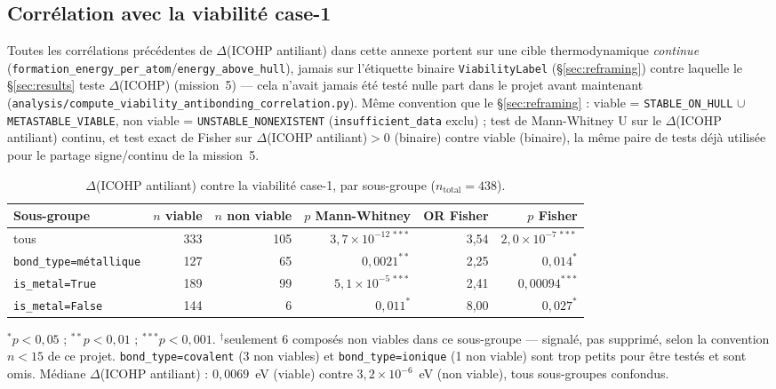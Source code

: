\documentclass[11pt,a4paper]{article}
\begin{document}
\subsection{Corrélation avec la viabilité case-1}
\label{sec:antibonding-viability}

Toutes les corrélations précédentes de $\Delta$(ICOHP antiliant) dans
cette annexe portent sur une cible thermodynamique \emph{continue}
(\texttt{formation\_energy\_per\_atom}/\texttt{energy\_above\_hull}),
jamais sur l'étiquette binaire \texttt{ViabilityLabel}
(\S\ref{sec:reframing}) contre laquelle le \S\ref{sec:results} teste
$\Delta$(ICOHP) (mission~5) --- cela n'avait jamais été testé nulle part
dans le projet avant maintenant
(\texttt{analysis/compute\_viability\_antibonding\_correlation.py}).
Même convention que le \S\ref{sec:reframing} : viable =
\texttt{STABLE\_ON\_HULL} $\cup$ \texttt{METASTABLE\_VIABLE}, non viable
= \texttt{UNSTABLE\_NONEXISTENT} (\texttt{insufficient\_data} exclu) ;
test de Mann-Whitney U sur le $\Delta$(ICOHP antiliant) continu, et test
exact de Fisher sur $\Delta$(ICOHP antiliant)$>0$ (binaire) contre viable
(binaire), la même paire de tests déjà utilisée pour le partage
signe/continu de la mission~5.

\begin{table}[htbp]
\centering
\caption{$\Delta$(ICOHP antiliant) contre la viabilité case-1, par sous-groupe ($n_\text{total}=438$).}
\label{tab:viability-antibonding}
\begin{tabular}{@{}lrrrrr@{}}
\toprule
Sous-groupe & $n$ viable & $n$ non viable & $p$ Mann-Whitney & OR Fisher & $p$ Fisher \\
\midrule
tous                     & 333 & 105 & $3,7\times10^{-12\,***}$ & 3,54 & $2,0\times10^{-7\,***}$ \\
\texttt{bond\_type=métallique} & 127 & 65  & $0{,}0021^{**}$          & 2,25 & $0{,}014^{*}$ \\
\texttt{is\_metal=True}      & 189 & 99  & $5,1\times10^{-5\,***}$  & 2,41 & $0{,}00094^{***}$ \\
\texttt{is\_metal=False}     & 144 & 6\rlap{$^\dagger$}   & $0{,}011^{*}$            & 8,00 & $0{,}027^{*}$ \\
\bottomrule
\end{tabular}

\vspace{0.15cm}
{\footnotesize $^{*}p<0{,}05$ ; $^{**}p<0{,}01$ ; $^{***}p<0{,}001$.
$^\dagger$seulement 6 composés non viables dans ce sous-groupe --- signalé,
pas supprimé, selon la convention $n<15$ de ce projet.
\texttt{bond\_type=covalent} (3 non viables) et \texttt{bond\_type=ionique}
(1 non viable) sont trop petits pour être testés et sont omis. Médiane
$\Delta$(ICOHP antiliant) : $0{,}0069$~eV (viable) contre
$3{,}2\times10^{-6}$~eV (non viable), tous sous-groupes confondus.}
\end{table}
\end{document}
